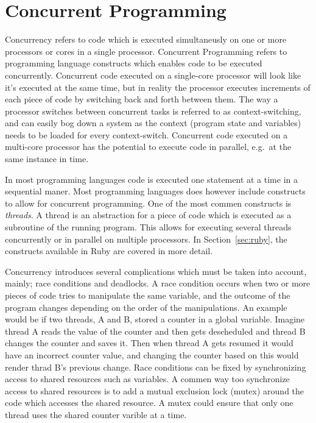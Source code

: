 \section{Concurrent Programming} %
\label{sec:concurrent}
Concurrency refers to code which is executed simultaneusly on one or more
processors or cores in a single processor. Concurrent Programming refers to
programming language constructs which enables code to be executed concurrently.
Concurrent code executed on a single-core processor will look like it's executed
at the same time, but in reality the processor executes increments of each piece
of code by switching back and forth between them. The way a processor switches
between concurrent tasks is referred to as context-switching, and can easily bog
down a system as the context (program state and variables) needs to be loaded
for every context-switch.  Concurrent code executed on a multi-core processor
has the potential to execute code in parallel, e.g.\ at the same instance in
time.

In most programming languages code is executed one statement at a time in a
sequential maner. Most programming languages does however include constructs
to allow for concurrent programming.  One of the most commen constructs is
\textit{threads}. A thread is an abstraction for a piece of code which is
executed as a subroutine of the running program. This allows for executing
several threads concurrently or in parallel on multiple processors.  In
Section~\ref{sec:ruby}, the constructs available in Ruby are covered in more
detail.

Concurrency introduces several complications which must be taken into account,
mainly; race conditions and deadlocks. A race condition occurs when two or more
pieces of code tries to manipulate the same variable, and the outcome of the
program changes depending on the order of the manipulations. An example would be
if two threads, A and B, stored a counter in a global variable. Imagine thread A 
reads the value of the counter and then gets descheduled and thread B changes
the counter and saves it. Then when thread A gets resumed it would have an
incorrect counter value, and changing the counter based on this would render
thrad B's previous change. Race conditions can be fixed by synchronizing access
to shared resources such as variables. A commen way too synchronize access to
shared resources is to add a mutual exclusion lock (mutex) around the code which
accesses the shared resource. A mutex could ensure that only one thread uses the
shared counter varible at a time. 

